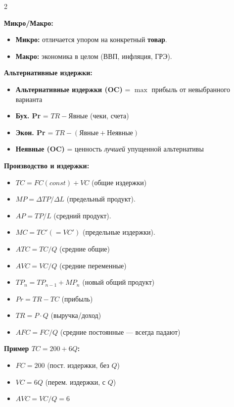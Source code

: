 \documentclass[14pt,a4paper]{article}
\newenvironment{insep}
	{\noindent\begin{minipage}{\linewidth}}
	{\hspace*{1cm}\end{minipage}}
\begin{document}
\begin{multicols}{2} %

\begin{insep}
	\textbf{Микро/Макро:}
	\begin{itemize}
		\item \textbf{Микро:} отличается упором на конкретный \textbf{товар}.
		\item \textbf{Макро:} экономика в целом (ВВП, инфляция, ГРЭ).
	\end{itemize}
	
	\textbf{Альтернативные издержки:}
	\begin{itemize}
		\item \textbf{Альтернативные издержки (OC)} = $\max$ прибыль от невыбранного варианта
		\item \textbf{Бух. Pr} = $TR - \text{Явные}$ (чеки, счета)
		\item \textbf{Экон. Pr} = $TR - (\text{Явные} + \text{Неявные})$
		\item \textbf{Неявные (OC)} = ценность \textit{лучшей} упущенной альтернативы
	\end{itemize}
	
	\textbf{Производство и издержки:}
	\begin{itemize}
		\item $TC = FC(const) + VC$ (общие издержки)
		\item $MP = \Delta TP / \Delta L$ (предельный продукт).
		\item $AP = TP / L$ (средний продукт).
		\item $MC = TC' (= VC')$ (предельные издержки).
		\item $ATC = TC / Q$ (средние общие)
		\item $AVC = VC / Q$ (средние переменные)
		\item $TP_n = TP_{n-1} + MP_n$ (новый общий продукт)
		\item $Pr = TR - TC$ (прибыль)
		\item $TR = P \cdot Q$ (выручка/доход)
		\item $AFC = FC / Q$ (средние постоянные — всегда падают)
	\end{itemize}
	
	\textbf{Пример $TC = 200 + 6Q$:}
	\begin{itemize}
		\item $FC = 200$ (пост. издержки, без $Q$)
		\item $VC = 6Q$ (перем. издержки, с $Q$)
		\item $AVC = VC/Q = 6$
	\end{itemize}
	

\end{insep}
\end{multicols}
\end{document}
